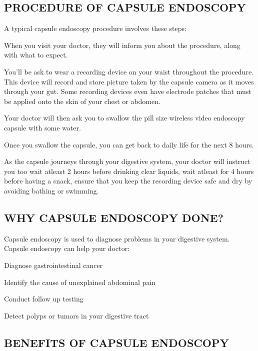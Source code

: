 \documentclass[12pt]{article}
\begin{document}
\subsection{PROCEDURE OF CAPSULE ENDOSCOPY}

{\large A typical capsule endoscopy procedure involves these steps:\\}
\begin{enumerate}
{\large \item When you visit your doctor, they will inform you about the procedure, along with what to expect.
\item You'll be ask to wear a recording device on your waist throughout the procedure. This device will record and store picture taken by the capsule camera as it moves through your gut. Some recording devices even have electrode patches that must be applied onto the skin of your chest or abdomen.
\item Your doctor will then ask you to swallow the pill size wireless video endoscopy capsule with some water.
\item Once you swallow the capsule, you can get back to daily life for the next 8 hours.
\item As the capsule journeys through your digestive system, your doctor will instruct you too wait atleast 2 hours before drinking clear liquids, wait atleast for 4 hours before having a snack, ensure that you keep the recording device safe and dry by avoiding bathing or swimming.}

\end{enumerate}




\subsection{WHY CAPSULE ENDOSCOPY DONE?}


{\large Capsule  endoscopy is used to diagnose problems in your digestive system. Capsule endoscopy can help your doctor:}

\begin{itemize}
{\large \item Diagnose gastrointestinal cancer 
\item Identify the cause of unexplained abdominal pain
\item Conduct follow up testing
\item Detect polyps or tumors in your digestive tract}
\end{itemize}


\subsection{BENEFITS OF CAPSULE ENDOSCOPY}
\end{document}
